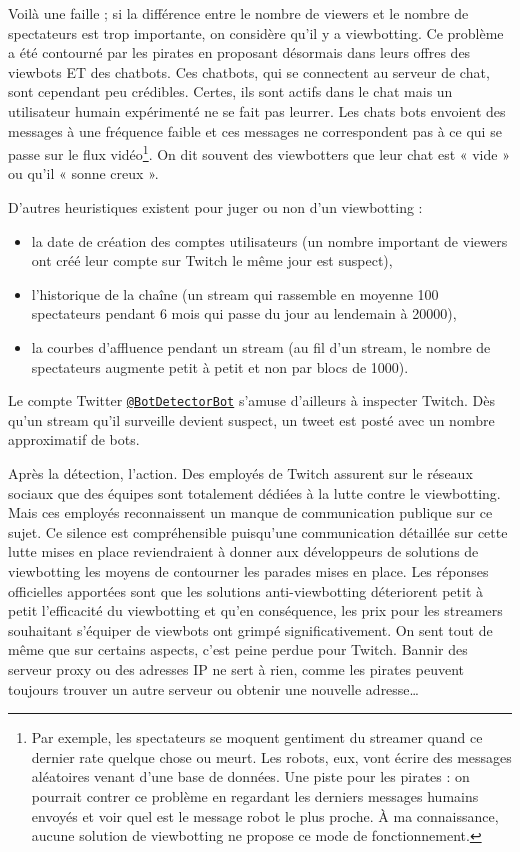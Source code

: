 \documentclass[a4paper]{article}
\begin{document}
Voilà une faille ; si la différence entre le nombre de viewers et le nombre de spectateurs est trop importante, on considère qu'il y a viewbotting. Ce problème a été contourné par les pirates en proposant désormais dans leurs offres des viewbots ET des chatbots. Ces chatbots, qui se connectent au serveur de chat, sont cependant peu crédibles. Certes, ils sont actifs dans le chat mais un utilisateur humain expérimenté ne se fait pas leurrer. Les chats bots envoient des messages à une fréquence faible et ces messages ne correspondent pas à ce qui se passe sur le flux vidéo\footnote{Par exemple, les spectateurs se moquent gentiment du streamer quand ce dernier rate quelque chose ou meurt. Les robots, eux, vont écrire des messages aléatoires venant d'une base de données. Une piste pour les pirates : on pourrait contrer ce problème en regardant les derniers messages humains envoyés et voir quel est le message robot le plus proche. À ma connaissance, aucune solution de viewbotting ne propose ce mode de fonctionnement.}. On dit souvent des viewbotters que leur chat est « vide » ou qu'il « sonne creux ».

D'autres heuristiques existent pour juger ou non d'un viewbotting :
\begin{itemize}
\item la date de création des comptes utilisateurs (un nombre important de viewers ont créé leur compte sur Twitch le même jour est suspect),
\item l'historique de la chaîne (un stream qui rassemble en moyenne 100 spectateurs pendant 6 mois qui passe du jour au lendemain à 20000),
\item la courbes d'affluence pendant un stream (au fil d'un stream, le nombre de spectateurs augmente petit à petit et non par blocs de 1000).
\end{itemize}
Le compte Twitter \href{https://twitter.com/botdetectorbot}{\texttt{@BotDetectorBot}} s'amuse d'ailleurs à inspecter Twitch. Dès qu'un stream qu'il surveille devient suspect, un tweet est posté avec un nombre approximatif de bots.

Après la détection, l'action. Des employés de Twitch assurent sur le réseaux sociaux que des équipes sont totalement dédiées à la lutte contre le viewbotting. Mais ces employés reconnaissent un manque de communication publique sur ce sujet. Ce silence est compréhensible puisqu'une communication détaillée sur cette lutte mises en place reviendraient à donner aux développeurs de solutions de viewbotting les moyens de contourner les parades mises en place. Les réponses officielles apportées sont que les solutions anti-viewbotting déteriorent petit à petit l'efficacité du viewbotting et qu'en conséquence, les prix pour les streamers souhaitant s'équiper de viewbots ont grimpé significativement. On sent tout de même que sur certains aspects, c'est peine perdue pour Twitch. Bannir des serveur proxy ou des adresses IP ne sert à rien, comme les pirates peuvent toujours trouver un autre serveur ou obtenir une nouvelle adresse\ldots
\end{document}
